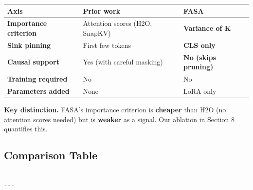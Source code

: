 \begin{table}[H]
\centering
\small
\begin{tabular}{lll}
\toprule
\textbf{Axis} & \textbf{Prior work} & \textbf{FASA} \\
\midrule
\textbf{Importance criterion} & Attention scores (H2O, SnapKV) & \textbf{Variance of K} \\
\textbf{Sink pinning} & First few tokens & \textbf{CLS only} \\
\textbf{Causal support} & Yes (with careful masking) & \textbf{No (skips pruning)} \\
\textbf{Training required} & No & No \\
\textbf{Parameters added} & None & LoRA only \\
\bottomrule
\end{tabular}
\end{table}

\textbf{Key distinction.} FASA's importance criterion is \textbf{cheaper} than H2O 
(no attention scores needed) but is \textbf{weaker} as a signal. Our ablation 
in Section 8 quantifies this.



\subsection{Comparison Table}

\begin{lstlisting}

---
\end{lstlisting}